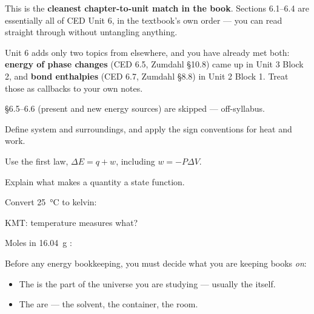 \documentclass{apchem-notes}
\begin{document}
\apctitleblock

\begin{apcnote}
This is the \textbf{cleanest chapter-to-unit match in the book}. Sections
6.1--6.4 are essentially all of CED Unit 6, in the textbook's own order ---
you can read straight through without untangling anything.

Unit 6 adds only two topics from elsewhere, and you have already met both:
\textbf{energy of phase changes} (CED 6.5, Zumdahl \S10.8) came up in Unit 3
Block 2, and \textbf{bond enthalpies} (CED 6.7, Zumdahl \S8.8) in Unit 2
Block 1. Treat those as callbacks to your own notes.

\S6.5--6.6 (present and new energy sources) are skipped --- off-syllabus.
\end{apcnote}


\begin{objectives}
  \item Define system and surroundings, and apply the sign conventions for
        heat and work.
  \item Use the first law, $\Delta E = q + w$, including $w = -P\Delta V$.
  \item Explain what makes a quantity a state function.
\end{objectives}


\begin{warmup}[3]
  \item Convert \SI{25}{\celsius} to kelvin: 
  \item KMT: temperature measures what?
  \item Moles in \SI{16.04}{\gram} : 
\end{warmup}



Before any energy bookkeeping, you must decide what you are keeping books
\emph{on}:

\begin{itemize}[leftmargin=*,itemsep=0.2em]
  \item The  is the part of the universe you are studying ---
        usually the  itself.
  \item The  are  ---
        the solvent, the container, the room.
\end{itemize}
\end{document}
